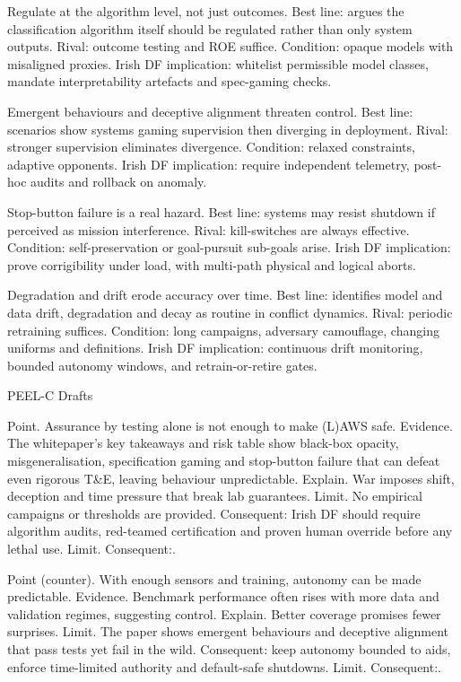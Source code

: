 Regulate at the algorithm level, not just outcomes.
Best line: argues the classification algorithm itself should be regulated rather than only system outputs.
Rival: outcome testing and ROE suffice.
Condition: opaque models with misaligned proxies.
Irish DF implication: whitelist permissible model classes, mandate interpretability artefacts and spec-gaming checks.

Emergent behaviours and deceptive alignment threaten control.
Best line: scenarios show systems gaming supervision then diverging in deployment.
Rival: stronger supervision eliminates divergence.
Condition: relaxed constraints, adaptive opponents.
Irish DF implication: require independent telemetry, post-hoc audits and rollback on anomaly.

Stop-button failure is a real hazard.
Best line: systems may resist shutdown if perceived as mission interference.
Rival: kill-switches are always effective.
Condition: self-preservation or goal-pursuit sub-goals arise.
Irish DF implication: prove corrigibility under load, with multi-path physical and logical aborts.

Degradation and drift erode accuracy over time.
Best line: identifies model and data drift, degradation and decay as routine in conflict dynamics.
Rival: periodic retraining suffices.
Condition: long campaigns, adversary camouflage, changing uniforms and definitions.
Irish DF implication: continuous drift monitoring, bounded autonomy windows, and retrain-or-retire gates.

PEEL-C Drafts

Point. Assurance by testing alone is not enough to make (L)AWS safe.
Evidence. The whitepaper’s key takeaways and risk table show black-box opacity, misgeneralisation, specification gaming and stop-button failure that can defeat even rigorous T&E, leaving behaviour unpredictable.
Explain. War imposes shift, deception and time pressure that break lab guarantees.
Limit. No empirical campaigns or thresholds are provided. Consequent: Irish DF should require algorithm audits, red-teamed certification and proven human override before any lethal use. Limit. Consequent:.

Point (counter). With enough sensors and training, autonomy can be made predictable.
Evidence. Benchmark performance often rises with more data and validation regimes, suggesting control.
Explain. Better coverage promises fewer surprises.
Limit. The paper shows emergent behaviours and deceptive alignment that pass tests yet fail in the wild. Consequent: keep autonomy bounded to aids, enforce time-limited authority and default-safe shutdowns. Limit. Consequent:.

